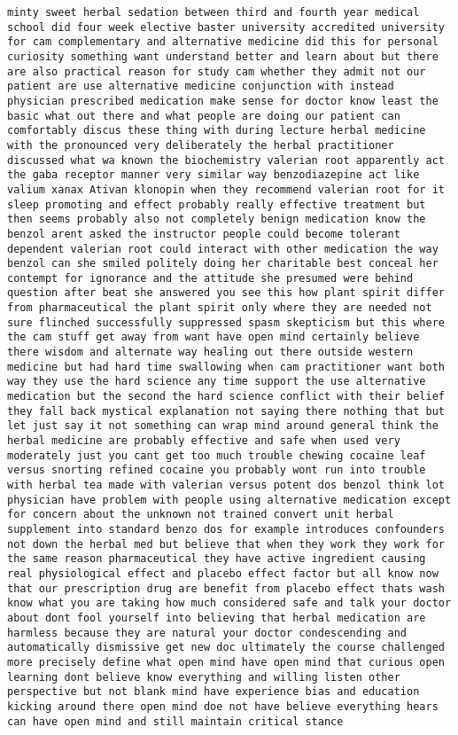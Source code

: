 \documentclass[11pt]{article}
\begin{document}
\begin{Verbatim}[commandchars=\\\{\}]
minty sweet herbal sedation between third and fourth year medical school did four week elective baster university accredited university for cam complementary and alternative medicine did this for personal curiosity something want understand better and learn about but there are also practical reason for study cam whether they admit not our patient are use alternative medicine conjunction with instead physician prescribed medication make sense for doctor know least the basic what out there and what people are doing our patient can comfortably discus these thing with during lecture herbal medicine with the pronounced very deliberately the herbal practitioner discussed what wa known the biochemistry valerian root apparently act the gaba receptor manner very similar way benzodiazepine act like valium xanax Ativan klonopin when they recommend valerian root for it sleep promoting and effect probably really effective treatment but then seems probably also not completely benign medication know the benzol arent asked the instructor people could become tolerant dependent valerian root could interact with other medication the way benzol can she smiled politely doing her charitable best conceal her contempt for ignorance and the attitude she presumed were behind question after beat she answered you see this how plant spirit differ from pharmaceutical the plant spirit only where they are needed not sure flinched successfully suppressed spasm skepticism but this where the cam stuff get away from want have open mind certainly believe there wisdom and alternate way healing out there outside western medicine but had hard time swallowing when cam practitioner want both way they use the hard science any time support the use alternative medication but the second the hard science conflict with their belief they fall back mystical explanation not saying there nothing that but let just say it not something can wrap mind around general think the herbal medicine are probably effective and safe when used very moderately just you cant get too much trouble chewing cocaine leaf versus snorting refined cocaine you probably wont run into trouble with herbal tea made with valerian versus potent dos benzol think lot physician have problem with people using alternative medication except for concern about the unknown not trained convert unit herbal supplement into standard benzo dos for example introduces confounders not down the herbal med but believe that when they work they work for the same reason pharmaceutical they have active ingredient causing real physiological effect and placebo effect factor but all know now that our prescription drug are benefit from placebo effect thats wash know what you are taking how much considered safe and talk your doctor about dont fool yourself into believing that herbal medication are harmless because they are natural your doctor condescending and automatically dismissive get new doc ultimately the course challenged more precisely define what open mind have open mind that curious open learning dont believe know everything and willing listen other perspective but not blank mind have experience bias and education kicking around there open mind doe not have believe everything hears can have open mind and still maintain critical stance 
\end{Verbatim}
\end{document}
